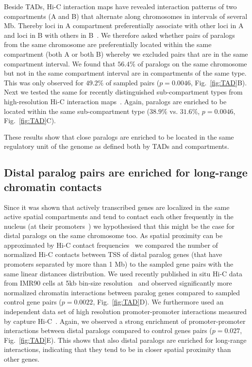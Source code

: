 \documentclass[a4paper,twoside=true,openright,parskip=full,chapterprefix=true,11pt,headings=normal,bibliography=totoc,listof=totoc,titlepage=on,captions=tableabove,draft=false]{scrreprt}
\theoremstyle{definition}
\theoremstyle{definition}
\theoremstyle{definition}
\theoremstyle{remark}
\begin{document}
Beside TADs, Hi-C interaction maps have revealed interaction patterns of
two compartments (A and B) that alternate along chromosomes in intervals
of several Mb. Thereby loci in A compartment preferentially associate
with other loci in A and loci in B with others in
B~\citep{Lieberman-Aiden2009, Rao2014, Dekker2013}. We therefore asked
whether pairs of paralogs from the same chromosome are preferentially
located within the same compartment (both A or both B) whereby we
excluded pairs that are in the same compartment interval. We found that
\(56.4\%\) of paralogs on the same chromosome but not in the same
compartment interval are in compartments of the same type. This was only
observed for \(49.2\%\) of sampled pairs (\(p=0.0046\),
Fig.~\ref{fig:TAD}B). Next we tested the same for recently distinguished
sub-compartment types from high-resolution Hi-C interaction
maps~\citep{Rao2014}. Again, paralogs are enriched to be located within
the same sub-compartment type (\(38.9\%\) vs. \(31.6\%\), \(p=0.0046\),
Fig.~\ref{fig:TAD}C).

These results show that close paralogs are enriched to be located in the
same regulatory unit of the genome as defined both by TADs and
compartments.

\subsection{Distal paralog pairs are enriched for long-range chromatin
contacts}\label{distal-paralog-pairs-are-enriched-for-long-range-chromatin-contacts}

Since it was shown that actively transcribed genes are localized in the
same active spatial compartments and tend to contact each other
frequently in the nucleus (at their
promoters~\citep{Cremer2015, Mifsud2015}) we hypothesised that this
might be the case for distal paralogs on the same chromosome too. As
spatial proximity can be approximated by Hi-C contact
frequencies~\citep{Lieberman-Aiden2009} we compared the number of
normalized Hi-C contacts between TSS of distal paralog genes (that have
promoters separated by more than 1 Mb) to the sampled gene pairs with
the same linear distances distribution. We used recently published in
situ Hi-C data from IMR90 cells at 5kb bin-size
resolution~\citep{Rao2014} and observed significantly more normalized
chromatin interactions between paralog genes compared to sampled control
gene pairs (\(p=0.0022\), Fig.~\ref{fig:TAD}D). We furthermore used an
independent data set of high resolution promoter-promoter interactions
measured by capture Hi-C~\citep{Mifsud2015}. Again, we observed a strong
enrichment of promoter-promoter interactions between distal paralogs
compared to control genes pairs (\(p=0.027\), Fig.~\ref{fig:TAD}E). This
shows that also distal paralogs are enriched for long-range
interactions, indicating that they tend to be in closer spatial
proximity than other genes.
\end{document}
